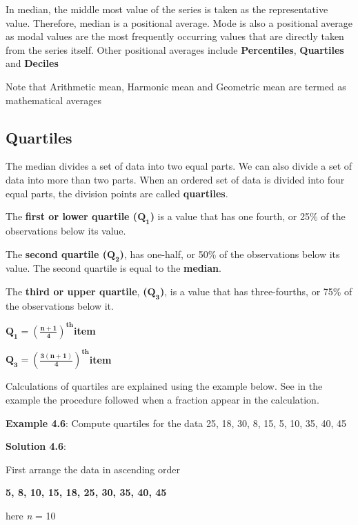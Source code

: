 \documentclass[
]{book}
\begin{document}
In median, the middle most value of the series is taken as the
representative value. Therefore, median is a positional average. Mode is
also a positional average as modal values are the most frequently
occurring values that are directly taken from the series itself. Other
positional averages include \textbf{Percentiles}, \textbf{Quartiles} and
\textbf{Deciles}

Note that Arithmetic mean, Harmonic mean and Geometric mean are termed
as mathematical averages

\subsection{Quartiles}\label{quartile}

The median divides a set of data into two equal parts. We can also
divide a set of data into more than two parts. When an ordered set of
data is divided into four equal parts, the division points are called
\textbf{quartiles}.

The \textbf{first or lower quartile (}\(\mathbf{Q}_{\mathbf{1}}\)\textbf{)} is a
value that has one fourth, or 25\% of the observations below its value.

The \textbf{second quartile (}\(\mathbf{Q}_{\mathbf{2}}\)\textbf{)}, has one-half,
or 50\% of the observations below its value. The second quartile is equal
to the \textbf{median}.

The \textbf{third or upper quartile}, \textbf{(}\(\mathbf{Q}_{\mathbf{3}}\)\textbf{)}, is
a value that has three-fourths, or 75\% of the observations below it.

\(\mathbf{Q}_{\mathbf{1}}\mathbf{=}\left( \frac{\mathbf{n + 1}}{\mathbf{4}} \right)^{\mathbf{\text{th}}}\)\textbf{item}

\(\mathbf{Q}_{\mathbf{3}}\mathbf{=}\left( \frac{\mathbf{3(n + 1)}}{\mathbf{4}} \right)^{\mathbf{\text{th}}}\)\textbf{item}

Calculations of quartiles are explained using the example below. See in
the example the procedure followed when a fraction appear in the
calculation.

\textbf{Example 4.6}: Compute quartiles for the data 25, 18, 30, 8, 15, 5,
10, 35, 40, 45

\textbf{Solution 4.6}:

First arrange the data in ascending order

\textbf{5, 8, 10, 15, 18, 25, 30, 35, 40, 45}

here \emph{n} = 10
\end{document}
